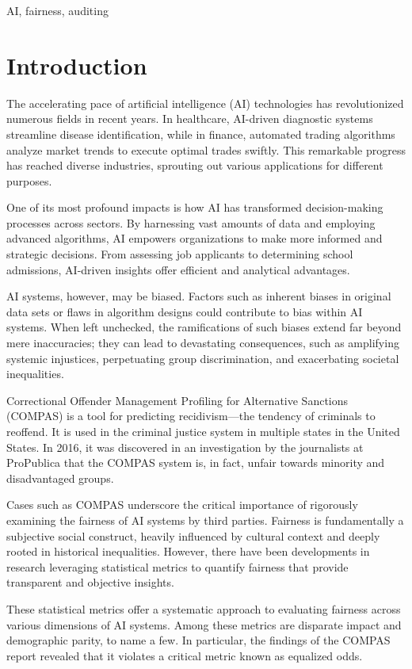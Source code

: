 \documentclass[conference]{IEEEtran}
\begin{document}
\begin{IEEEkeywords}
AI, fairness, auditing
\end{IEEEkeywords}

\section{Introduction}
The accelerating pace of artificial intelligence (AI) technologies has revolutionized numerous fields in recent years. In healthcare, AI-driven diagnostic systems streamline disease identification, while in finance, automated trading algorithms analyze market trends to execute optimal trades swiftly. This remarkable progress has reached diverse industries, sprouting out various applications for different purposes.

One of its most profound impacts is how AI has transformed decision-making processes across sectors. By harnessing vast amounts of data and employing advanced algorithms, AI empowers organizations to make more informed and strategic decisions. From assessing job applicants to determining school admissions, AI-driven insights offer efficient and analytical advantages.

AI systems, however, may be biased. Factors such as inherent biases in original data sets or flaws in algorithm designs could contribute to bias within AI systems. When left unchecked, the ramifications of such biases extend far beyond mere inaccuracies; they can lead to devastating consequences, such as amplifying systemic injustices, perpetuating group discrimination, and exacerbating societal inequalities.

Correctional Offender Management Profiling for Alternative Sanctions (COMPAS) is a tool for predicting recidivism---the tendency of criminals to reoffend. It is used in the criminal justice system in multiple states in the United States. In 2016, it was discovered in an investigation by the journalists at ProPublica that the COMPAS system is, in fact, unfair towards minority and disadvantaged groups.

Cases such as COMPAS underscore the critical importance of rigorously examining the fairness of AI systems by third parties. Fairness is fundamentally a subjective social construct, heavily influenced by cultural context and deeply rooted in historical inequalities. However, there have been developments in research leveraging statistical metrics to quantify fairness that provide transparent and objective insights.

These statistical metrics offer a systematic approach to evaluating fairness across various dimensions of AI systems. Among these metrics are disparate impact and demographic parity, to name a few. In particular, the findings of the COMPAS report revealed that it violates a critical metric known as equalized odds.
\end{document}
